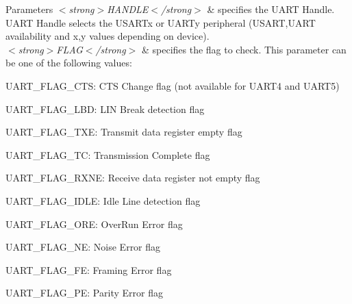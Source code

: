 \begin{DoxyParams}{Parameters}
{\em $<$strong$>$\-H\-A\-N\-D\-L\-E$<$/strong$>$} & specifies the U\-A\-R\-T Handle. U\-A\-R\-T Handle selects the U\-S\-A\-R\-Tx or U\-A\-R\-Ty peripheral (U\-S\-A\-R\-T,U\-A\-R\-T availability and x,y values depending on device). \\
\hline
{\em $<$strong$>$\-F\-L\-A\-G$<$/strong$>$} & specifies the flag to check. This parameter can be one of the following values\-: \begin{DoxyItemize}
\item U\-A\-R\-T\-\_\-\-F\-L\-A\-G\-\_\-\-C\-T\-S\-: C\-T\-S Change flag (not available for U\-A\-R\-T4 and U\-A\-R\-T5) \item U\-A\-R\-T\-\_\-\-F\-L\-A\-G\-\_\-\-L\-B\-D\-: L\-I\-N Break detection flag \item U\-A\-R\-T\-\_\-\-F\-L\-A\-G\-\_\-\-T\-X\-E\-: Transmit data register empty flag \item U\-A\-R\-T\-\_\-\-F\-L\-A\-G\-\_\-\-T\-C\-: Transmission Complete flag \item U\-A\-R\-T\-\_\-\-F\-L\-A\-G\-\_\-\-R\-X\-N\-E\-: Receive data register not empty flag \item U\-A\-R\-T\-\_\-\-F\-L\-A\-G\-\_\-\-I\-D\-L\-E\-: Idle Line detection flag \item U\-A\-R\-T\-\_\-\-F\-L\-A\-G\-\_\-\-O\-R\-E\-: Over\-Run Error flag \item U\-A\-R\-T\-\_\-\-F\-L\-A\-G\-\_\-\-N\-E\-: Noise Error flag \item U\-A\-R\-T\-\_\-\-F\-L\-A\-G\-\_\-\-F\-E\-: Framing Error flag \item U\-A\-R\-T\-\_\-\-F\-L\-A\-G\-\_\-\-P\-E\-: Parity Error flag \end{DoxyItemize}
\\
\hline
\end{DoxyParams}

